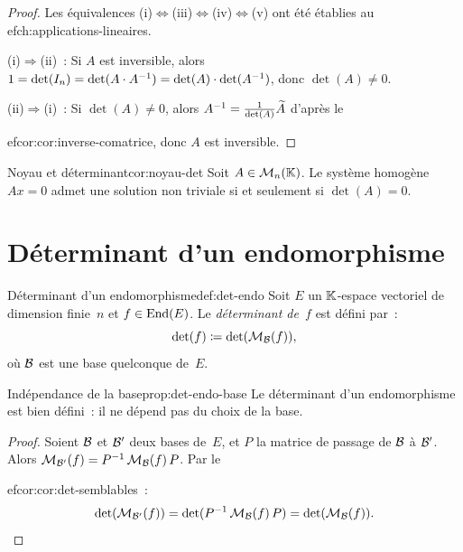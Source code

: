 \begin{proof}
  Les équivalences (i)$\Leftrightarrow$(iii)$\Leftrightarrow$(iv)$\Leftrightarrow$(v)
  ont été établies au 
ef{ch:applications-lineaires}.

  (i)$\Rightarrow$(ii)~: Si $A$ est inversible, alors
  $1=\det(I_n)=\det(A\cdot{A}^{-1})=\det(A)\cdot\det({A}^{-1})$, donc
  $\det(A)\neq 0$.

  (ii)$\Rightarrow$(i)~: Si $\det(A)\neq 0$, alors
  ${A}^{-1}=\frac{1}{\det(A)}\widetilde{A}$ d'après le
  
ef{cor:cor:inverse-comatrice}, donc $A$ est inversible.
\end{proof}

\begin{corollary}{Noyau et déterminant}{cor:noyau-det}
  Soit $A\in\mathcal{M}_n({\mathbb{K}})$. Le système homogène $Ax=0$ admet une solution
  non triviale si et seulement si $\det(A)=0$.
\end{corollary}

\section{Déterminant d'un endomorphisme}\label{sec:det-endomorphisme}

\begin{definition}{Déterminant d'un endomorphisme}{def:det-endo}
  Soit $E$ un ${\mathbb{K}}$-espace vectoriel de dimension finie~$n$ et
  $f\in\operatorname{End}(E)$. Le \emph{déterminant de~$f$}
  est défini par~:
  \[
    \det(f)\coloneqq\det(\mathcal{M}_{\mathcal{B}}(f)),
  \]
  où ${\mathcal{B}}$ est une base quelconque de~$E$.
\end{definition}

\begin{proposition}{Indépendance de la base}{prop:det-endo-base}
  Le déterminant d'un endomorphisme est bien défini~: il ne dépend pas
  du choix de la base.
\end{proposition}

\begin{proof}
  Soient ${\mathcal{B}}$ et ${\mathcal{B}}'$ deux bases de~$E$, et $P$ la matrice de passage
  de ${\mathcal{B}}$ à ${\mathcal{B}}'$. Alors
  $\mathcal{M}_{{\mathcal{B}}'}(f)={P}^{-1}\,\mathcal{M}_{\mathcal{B}}(f)\,P$. Par le
  
ef{cor:cor:det-semblables}~:
  \[
    \det(\mathcal{M}_{{\mathcal{B}}'}(f))=\det({P}^{-1}\,\mathcal{M}_{\mathcal{B}}(f)\,P)=\det(\mathcal{M}_{\mathcal{B}}(f)).
    \qedhere
  \]
\end{proof}

